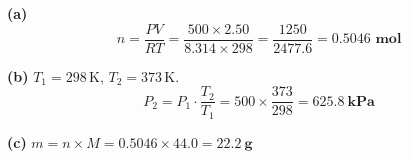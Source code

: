 \documentclass[addpoints]{exam}
\begin{document}
\begin{questions}
\begin{solution}[9cm]
\textbf{(a)}
\[
n = \frac{PV}{RT} = \frac{500 \times 2.50}{8.314 \times 298} = \frac{1250}{2477.6}
= \mathbf{0.5046 \text{ mol}}
\]

\textbf{(b)} $T_1 = 298\,\text{K}$,\; $T_2 = 373\,\text{K}$.
\[
P_2 = P_1 \cdot \frac{T_2}{T_1} = 500 \times \frac{373}{298} = \mathbf{\SI{625.8}{kPa}}
\]

\textbf{(c)} $m = n \times M = 0.5046 \times 44.0 = \mathbf{\SI{22.2}{g}}$
\end{solution}

\end{questions}
\end{document}
